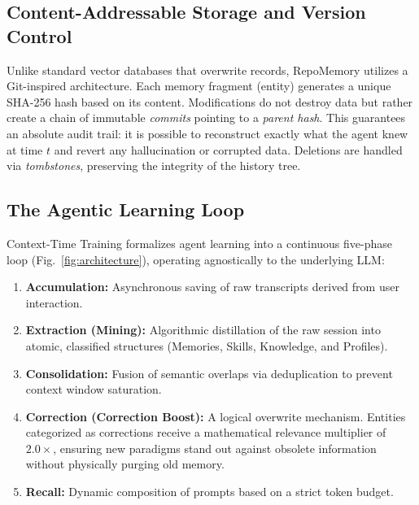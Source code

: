 \documentclass[conference]{IEEEtran}
\begin{document}
\subsection{Content-Addressable Storage and Version Control}
Unlike standard vector databases that overwrite records, RepoMemory utilizes a Git-inspired architecture. Each memory fragment (entity) generates a unique SHA-256 hash based on its content. Modifications do not destroy data but rather create a chain of immutable \emph{commits} pointing to a \emph{parent hash}. This guarantees an absolute audit trail: it is possible to reconstruct exactly what the agent knew at time $t$ and revert any hallucination or corrupted data. Deletions are handled via \emph{tombstones}, preserving the integrity of the history tree.
\subsection{The Agentic Learning Loop}
Context-Time Training formalizes agent learning into a continuous five-phase loop (Fig.~\ref{fig:architecture}), operating agnostically to the underlying LLM:
\begin{enumerate}
    \item \textbf{Accumulation:} Asynchronous saving of raw transcripts derived from user interaction.
    \item \textbf{Extraction (Mining):} Algorithmic distillation of the raw session into atomic, classified structures (Memories, Skills, Knowledge, and Profiles).
    \item \textbf{Consolidation:} Fusion of semantic overlaps via deduplication to prevent context window saturation.
    \item \textbf{Correction (Correction Boost):} A logical overwrite mechanism. Entities categorized as corrections receive a mathematical relevance multiplier of $2.0\times$, ensuring new paradigms stand out against obsolete information without physically purging old memory.
    \item \textbf{Recall:} Dynamic composition of prompts based on a strict token budget.
\end{enumerate}
\end{document}
